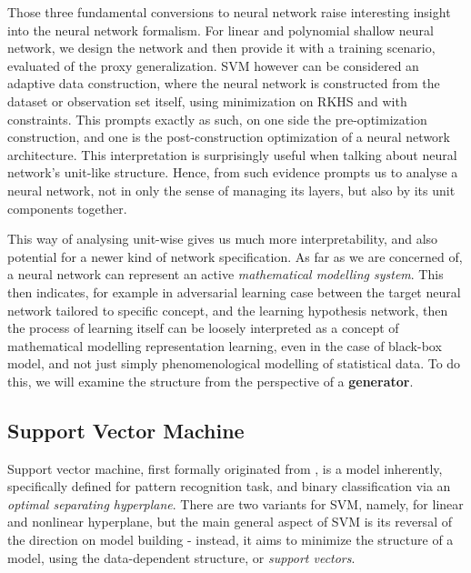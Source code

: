 \documentclass[10pt]{article} %
\begin{document}
Those three fundamental conversions to neural network raise interesting insight into the neural network formalism. For linear and polynomial shallow neural network, we design the network and then provide it with a training scenario, evaluated of the proxy generalization. SVM however can be considered an adaptive data construction, where the neural network is constructed from the dataset or observation set itself, using minimization on RKHS and with constraints. This prompts exactly as such, on one side the pre-optimization construction, and one is the post-construction optimization of a neural network architecture. This interpretation is surprisingly useful when talking about neural network's unit-like structure. Hence, from such evidence prompts us to analyse a neural network, not in only the sense of managing its layers, but also by its unit components together. 

This way of analysing unit-wise gives us much more interpretability, and also potential for a newer kind of network specification. As far as we are concerned of, a neural network can represent an active \textit{mathematical modelling system}. This then indicates, for example in adversarial learning case between the target neural network tailored to specific concept, and the learning hypothesis network, then the process of learning itself can be loosely interpreted as a concept of mathematical modelling representation learning, even in the case of black-box model, and not just simply phenomenological modelling of statistical data. To do this, we will examine the structure from the perspective of a \textbf{generator}.

\clearpage

\subsection{Support Vector Machine}

Support vector machine, first formally originated from \cite{Vapnik1999-VAPTNO}, is a model inherently, specifically defined for pattern recognition task, and binary classification via an \textit{optimal separating hyperplane}. There are two variants for SVM, namely, for linear and nonlinear hyperplane, but the main general aspect of SVM is its reversal of the direction on model building - instead, it aims to minimize the structure of a model, using the data-dependent structure, or \textit{support vectors}. 
\end{document}

